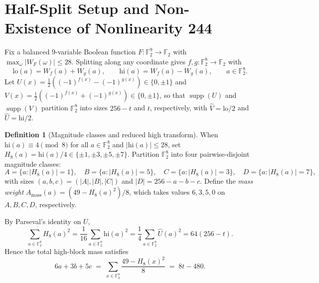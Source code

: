 \documentclass[11pt]{article}
\theoremstyle{definition}
\newtheorem{definition}[theorem]{Definition}
\newcommand{\F}{\mathbb{F}}
\newcommand{\supp}{\operatorname{supp}}
\begin{document}
\section{Half-Split Setup and Non-Existence of Nonlinearity 244}
\label{sec:setup}

Fix a balanced $9$-variable Boolean function $F : \F_2^9 \to \F_2$ with $\max_{\omega} |W_F(\omega)| \le 28$.
Splitting along any coordinate gives $f, g : \F_2^8 \to \F_2$ with
\[
  \mathrm{lo}(a) = W_f(a) + W_g(a), \qquad \mathrm{hi}(a) = W_f(a) - W_g(a), \qquad a \in \F_2^8.
\]
Let $U(x) = \frac{1}{2}((-1)^{f(x)} - (-1)^{g(x)}) \in \{0, \pm 1\}$ and $V(x) = \frac{1}{2}((-1)^{f(x)} + (-1)^{g(x)}) \in \{0, \pm 1\}$, so that $\supp(U)$ and $\supp(V)$ partition $\F_2^8$ into sizes $256 - t$ and $t$, respectively, with $\widehat{V} = \mathrm{lo}/2$ and $\widehat{U} = \mathrm{hi}/2$.

\begin{definition}[Magnitude classes and reduced high transform]
\label{def:classes}
When $\mathrm{hi}(a) \equiv 4 \pmod 8$ for all $a \in \F_2^8$ and $|\mathrm{hi}(a)| \le 28$, set $H_8(a) = \mathrm{hi}(a)/4 \in \{\pm 1, \pm 3, \pm 5, \pm 7\}$.
Partition $\F_2^8$ into four pairwise-disjoint magnitude classes:
\[
  A = \{a : |H_8(a)| = 1\},\quad
  B = \{a : |H_8(a)| = 5\},\quad
  C = \{a : |H_8(a)| = 3\},\quad
  D = \{a : |H_8(a)| = 7\},
\]
with sizes $(a, b, c) = (|A|, |B|, |C|)$ and $|D| = 256 - a - b - c$.
Define the \emph{mass weight} $A_{\mathrm{mass}}(a) = (49 - H_8(a)^2)/8$, which takes values $6, 3, 5, 0$ on $A, B, C, D$, respectively.
\end{definition}

By Parseval's identity on $U$,
\[
  \sum_{a \in \F_2^8} H_8(a)^2 = \frac{1}{16}\sum_{a \in \F_2^8} \mathrm{hi}(a)^2 = \frac{1}{4}\sum_{a \in \F_2^8} \widehat{U}(a)^2 = 64(256 - t).
\]
Hence the total high-block mass satisfies
\begin{equation}
\label{eq:total-mass}
  6a + 3b + 5c \;=\; \sum_{x \in \F_2^8} \frac{49 - H_8(x)^2}{8} \;=\; 8t - 480.
\end{equation}
\end{document}
